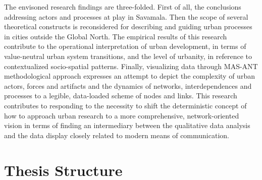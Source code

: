 \documentclass[11pt]{report}
\begin{document}
{{The envisoned research findings are three-folded.
First of all, the conclusions addressing actors and processes at play in Savamala.
Then the scope of several theoretical constructs is reconsidered for describing and guiding urban processes in cities outside the Global North.
The empirical results of this research contribute to the operational interpretation of urban development, in terms of value-neutral urban system transitions, and the level of urbanity, in reference to contextualized socio-spatial patterns.
Finally, visualizing data through MAS-ANT methodological approach expresses an attempt to depict the complexity of urban actors, forces and artifacts and the dynamics of networks, interdependences and processes to a legible, data-loaded scheme of nodes and links. This research contributes to responding to the necessity to shift the deterministic concept of how to approach urban research to a more comprehensive, network-oriented vision in terms of finding an intermediary between the qualitative data analysis and the data display closely related to modern means of communication.

\section{Thesis Structure}

}}
\end{document}
